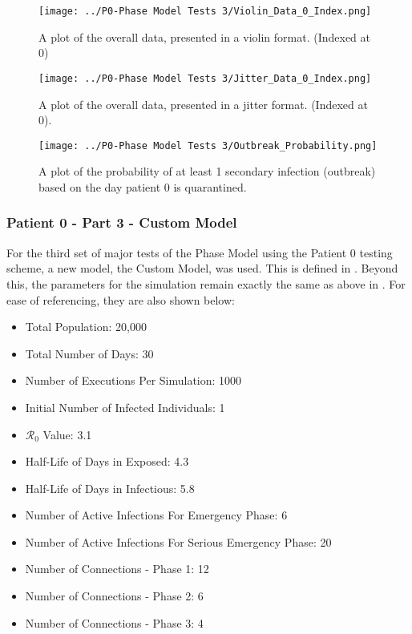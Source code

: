 \documentclass{article}
\numberwithin{equation}{section} %
\begin{document}
\begin{figure}[H]
  \centering
  \texttt{[image: ../P0-Phase Model Tests 3/Violin\_Data\_0\_Index.png]}
  \caption{A plot of the overall data, presented in a violin format. (Indexed at 0)}
\end{figure}

\begin{figure}[H]
  \centering
  \texttt{[image: ../P0-Phase Model Tests 3/Jitter\_Data\_0\_Index.png]}
  \caption{A plot of the overall data, presented in a jitter format. (Indexed at 0).}
\end{figure}

\begin{figure}[H]
  \centering
  \texttt{[image: ../P0-Phase Model Tests 3/Outbreak\_Probability.png]}
  \caption{A plot of the probability of at least 1 secondary infection (outbreak) based on the day patient 0 is quarantined.}
\end{figure}

\begin{multicols}{2}
  \subsubsection{Patient 0 - Part 3 - Custom Model}
  For the third set of major tests of the Phase Model using the Patient 0 testing scheme, a new model, the Custom Model, was used. This is defined in . Beyond this, the parameters for the simulation remain exactly the same as above in . For ease of referencing, they are also shown below:
  \begin{itemize}
  \item Total Population: 20,000 
  \item Total Number of Days: 30
  \item Number of Executions Per Simulation: 1000
  \item Initial Number of Infected Individuals: 1
  \item $\mathcal{R}_0$ Value: 3.1
  \item Half-Life of Days in Exposed: 4.3
  \item Half-Life of Days in Infectious: 5.8
  \item Number of Active Infections For Emergency Phase: 6
  \item Number of Active Infections For Serious Emergency Phase: 20
  \item Number of Connections - Phase 1: 12
  \item Number of Connections - Phase 2: 6
  \item Number of Connections - Phase 3: 4
  \end{itemize}
\end{multicols}
\end{document}
